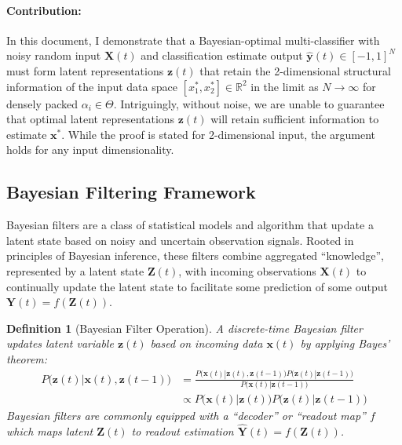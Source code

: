 \documentclass[12pt]{article}
\newtheorem{definition}{Definition}
\begin{document}
\paragraph{Contribution: } In this document, I demonstrate that a
Bayesian-optimal multi-classifier with noisy random input $\mathbf X(t)$ and
classification estimate output $\hat {\mathbf y}(t) \in [-1, 1]^N$ must form
latent representations $\mathbf z(t)$ that retain the 2-dimensional structural
information of the input data space $[x_1^*, x_2^*] \in \mathbb R^2$ in the
limit as $N\to \infty$ for densely packed $\alpha_i \in \Theta$. 
Intriguingly, without noise, we are unable to guarantee that optimal latent
representations $\mathbf z(t)$ will retain sufficient information to estimate
$\mathbf x^*$. 
While the proof is stated for 2-dimensional input, the argument holds for
any input dimensionality. 



\subsection{Bayesian Filtering Framework}

Bayesian filters are a class of statistical models and algorithm that update a
latent state based on noisy and uncertain observation signals. 
Rooted in principles of Bayesian inference, these filters combine aggregated 
``knowledge'', represented by a latent state $\mathbf Z(t)$, with incoming
observations $\mathbf X(t)$ to continually update the latent state to
facilitate some prediction of some output $\mathbf Y(t) = f(\mathbf Z(t))$. 


\begin{definition}[Bayesian Filter Operation]
	\label{def:bayesian_filter}
	A discrete-time Bayesian filter updates latent variable $\mathbf z(t)$
	based on incoming data $\mathbf x(t)$ by applying Bayes' theorem: 
	\begin{align}
		\label{eqn:bayes_filter}
		P \big(\mathbf z(t) | \mathbf  x(t), \mathbf z(t-1)\big) &= \frac{
			P\big(\mathbf x(t) | \mathbf z(t), \mathbf z(t-1)\big) 
			P\big(\mathbf z(t) | \mathbf z(t-1)\big)
		}{
			P\big(\mathbf x(t) | \mathbf z(t-1)\big)
		} \\
		&\propto P\big(\mathbf x(t) | \mathbf z(t) \big) 
			P\big(\mathbf z(t) | \mathbf z(t-1)\big)
	\end{align}
	Bayesian filters are commonly equipped with a ``decoder'' or ``readout
	map'' $f$ which maps latent $\mathbf Z(t)$ to readout estimation
	$\hat{\mathbf Y}(t) = f(\mathbf Z(t))$.
\end{definition}
\end{document}
